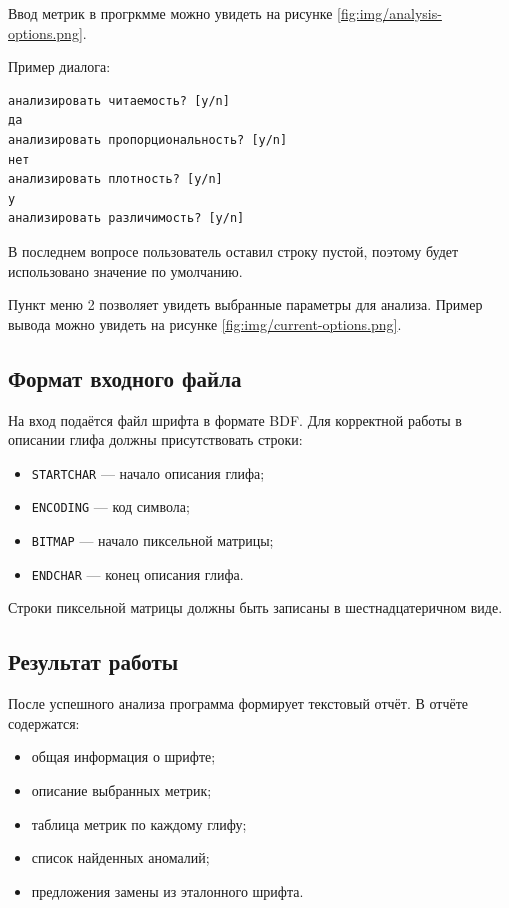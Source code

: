 Ввод метрик в прогркмме можно увидеть на рисунке \ref{fig:img/analysis-options.png}.

Пример диалога:

\begin{verbatim}
анализировать читаемость? [y/n]
да
анализировать пропорциональность? [y/n]
нет
анализировать плотность? [y/n]
y
анализировать различимость? [y/n]

\end{verbatim}

В последнем вопросе пользователь оставил строку пустой, поэтому будет использовано значение по умолчанию.

Пункт меню 2 позволяет увидеть выбранные параметры для анализа. Пример вывода можно увидеть на рисунке \ref{fig:img/current-options.png}.

\subsection{Формат входного файла}

На вход подаётся файл шрифта в формате BDF. Для корректной работы в описании глифа должны присутствовать строки:

\begin{itemize}
    \item \texttt{STARTCHAR} --- начало описания глифа;
    \item \texttt{ENCODING} --- код символа;
    \item \texttt{BITMAP} --- начало пиксельной матрицы;
    \item \texttt{ENDCHAR} --- конец описания глифа.
\end{itemize}

Строки пиксельной матрицы должны быть записаны в шестнадцатеричном виде.

\subsection{Результат работы}

После успешного анализа программа формирует текстовый отчёт. В отчёте содержатся:

\begin{itemize}
    \item общая информация о шрифте;
    \item описание выбранных метрик;
    \item таблица метрик по каждому глифу;
    \item список найденных аномалий;
    \item предложения замены из эталонного шрифта.
\end{itemize}

